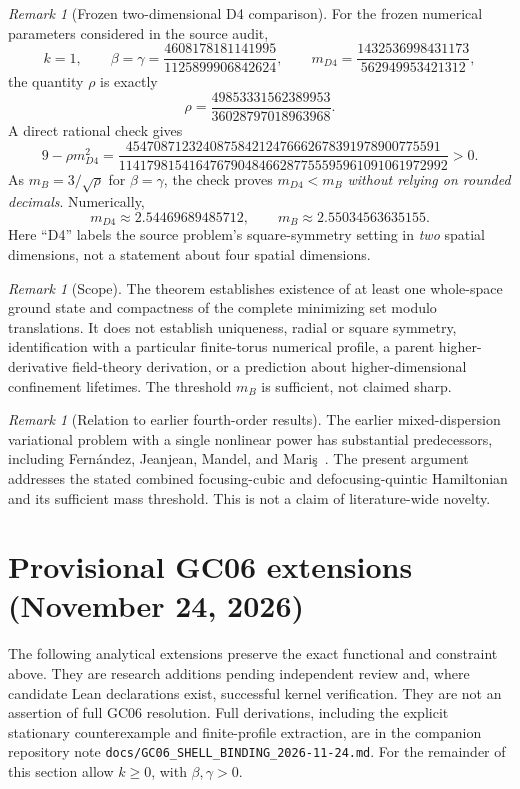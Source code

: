 \documentclass[11pt]{article}
\numberwithin{equation}{section}
\theoremstyle{remark}
\newtheorem{remark}[theorem]{Remark}
\begin{document}
\begin{remark}[Frozen two-dimensional D4 comparison]
For the frozen numerical parameters considered in the source audit,
\[
k=1,\qquad
\beta=\gamma=\frac{4608178181141995}{1125899906842624},
\qquad
m_{D4}=\frac{1432536998431173}{562949953421312},
\]
the quantity $\rho$ is exactly
\[
\rho=\frac{49853331562389953}{36028797018963968}.
\]
A direct rational check gives
\[
9-\rho m_{D4}^2
=\frac{454708712324087584212476662678391978900775591}
{11417981541647679048466287755595961091061972992}>0.
\]
As $m_B=3/\sqrt\rho$ for $\beta=\gamma$, the check proves
$m_{D4}<m_B$ \emph{without relying on rounded decimals}.
Numerically,
\[
m_{D4}\approx2.54469689485712,
\qquad m_B\approx2.55034563635155.
\]
Here ``D4'' labels the source problem's square-symmetry setting in
\emph{two} spatial dimensions, not a statement about four spatial
dimensions.
\end{remark}

\begin{remark}[Scope]
The theorem establishes existence of at least one whole-space ground state
and compactness of the complete minimizing set modulo translations.
It does not establish uniqueness, radial or square symmetry, identification
with a particular finite-torus numerical profile, a parent higher-derivative
field-theory derivation, or a prediction about higher-dimensional confinement
lifetimes.  The threshold $m_B$ is sufficient, not claimed sharp.
\end{remark}

\begin{remark}[Relation to earlier fourth-order results]
The earlier mixed-dispersion variational problem with a single
nonlinear power has substantial predecessors, including Fernández,
Jeanjean, Mandel, and Mariş~\cite{fernandez2022}.
The present argument addresses the stated combined focusing-cubic and
defocusing-quintic Hamiltonian and its sufficient mass threshold.
This is not a claim of literature-wide novelty.
\end{remark}


\section{Provisional GC06 extensions (November 24, 2026)}
\label{sec:gc06-extension}
The following analytical extensions preserve the exact functional and
constraint above. They are research additions pending independent review
and, where candidate Lean declarations exist, successful kernel verification.
They are not an assertion of full GC06 resolution. Full derivations,
including the explicit stationary counterexample and finite-profile
extraction, are in the companion repository note
\texttt{docs/GC06\_SHELL\_BINDING\_2026-11-24.md}.
For the remainder of this section allow $k\ge0$, with $\beta,\gamma>0$.
\end{document}
